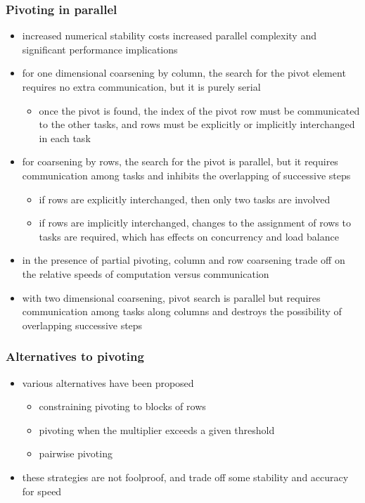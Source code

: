 \begin{frame}[fragile]
%
  \frametitle{Pivoting in parallel}
%
  \begin{itemize}
%
  \item increased numerical stability costs increased parallel complexity and significant
    performance implications
  \item for one dimensional coarsening by column, the search for the pivot element requires no
    extra communication, but it is purely serial
    \begin{itemize}
    \item once the pivot is found, the index of the pivot row must be communicated to the other
      tasks, and rows must be explicitly or implicitly interchanged in each task
    \end{itemize}
  \item for coarsening by rows, the search for the pivot is parallel, but it requires
    communication among tasks and inhibits the overlapping of successive steps
    \begin{itemize}
    \item if rows are explicitly interchanged, then only two tasks are involved
    \item if rows are implicitly interchanged, changes to the assignment of rows to tasks are
      required, which has effects on concurrency and load balance
    \end{itemize}
  \item in the presence of partial pivoting, column and row coarsening trade off on the
    relative speeds of computation versus communication
%
  \item with two dimensional coarsening, pivot search is parallel but requires communication
    among tasks along columns and destroys the possibility of overlapping successive steps
%
  \end{itemize}
%
\end{frame}

\begin{frame}[fragile]
%
  \frametitle{Alternatives to pivoting}
%
  \begin{itemize}
%
  \item various alternatives have been proposed
    \begin{itemize}
    \item constraining pivoting to blocks of rows
    \item pivoting when the multiplier exceeds a given threshold
    \item pairwise pivoting 
    \end{itemize}
%
  \item these strategies are not foolproof, and trade off some stability and accuracy for speed
%
  \end{itemize}
%
\end{frame}

